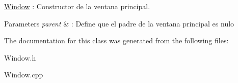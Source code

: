 \hyperlink{class_window}{Window} \+: Constructor de la ventana principal. 


\begin{DoxyParams}{Parameters}
{\em parent} & \+: Define que el padre de la ventana principal es nulo \\
\hline
\end{DoxyParams}


The documentation for this class was generated from the following files\+:\begin{DoxyCompactItemize}
\item 
Window.\+h\item 
Window.\+cpp\end{DoxyCompactItemize}
